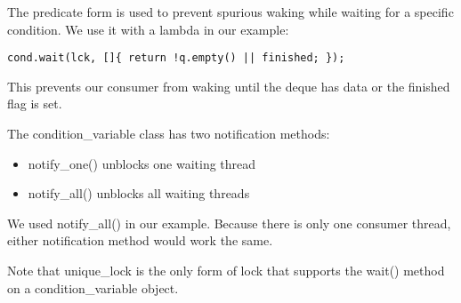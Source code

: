The predicate form is used to prevent spurious waking while waiting for a specific condition. We use it with a lambda in our example:

\begin{lstlisting}[style=styleCXX]
cond.wait(lck, []{ return !q.empty() || finished; });
\end{lstlisting}

This prevents our consumer from waking until the deque has data or the finished flag is set.

The condition\_variable class has two notification methods:

\begin{itemize}
\item 
notify\_one() unblocks one waiting thread

\item 
notify\_all() unblocks all waiting threads
\end{itemize}

We used notify\_all() in our example. Because there is only one consumer thread, either notification method would work the same.

\begin{tcolorbox}[colback=webgreen!5!white,colframe=webgreen!75!black,title=Note]
Note that unique\_lock is the only form of lock that supports the wait() method on a condition\_variable object.
\end{tcolorbox}






